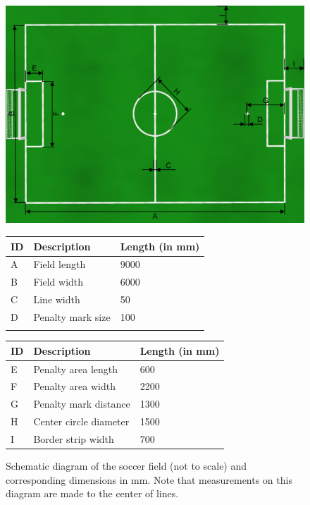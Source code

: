 \documentclass[12pt]{article}
\begin{document}
\begin{figure}[b!]
\centerline{\includegraphics[width=\columnwidth]{figs/fieldDimensions2015.pdf}}
\vspace{1ex}
\begin{tabular}{| l | l | l |}
ID & Description & Length (in mm) \\
\hline
A & Field length & 9000 \\
\hline
B & Field width & 6000 \\
\hline
C & Line width & 50 \\ 
\hline
D & Penalty mark size & 100 \\ 
\hline
 &  &  \\
\end{tabular}
\begin{tabular}{|l|l|l|}
ID & Description & Length (in mm) \\
\hline
E & Penalty area length & 600 \\
\hline
F & Penalty area width & 2200 \\
\hline
G & Penalty mark distance & 1300 \\ 
\hline
H & Center circle diameter & 1500 \\
\hline
I & Border strip width & 700 \\
\end{tabular}
\caption{Schematic diagram of the soccer field (not to scale) and corresponding dimensions in mm.  Note that measurements on this diagram are made to the center of lines.} \label{fig:field_dim}
\end{figure}
\end{document}
